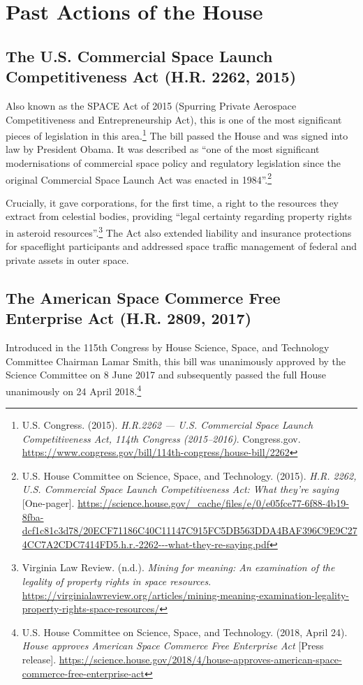 \section{Past Actions of the House}

\subsection{The U.S. Commercial Space Launch Competitiveness Act (H.R. 2262, 2015)}

Also known as the SPACE Act of 2015 (Spurring Private Aerospace Competitiveness and Entrepreneurship Act), this is one of the most significant pieces of legislation in this area.\footnote{U.S. Congress. (2015). \emph{H.R.2262 — U.S. Commercial Space Launch Competitiveness Act, 114th Congress (2015–2016)}. Congress.gov. \url{https://www.congress.gov/bill/114th-congress/house-bill/2262}} The bill passed the House and was signed into law by President Obama. It was described as “one of the most significant modernisations of commercial space policy and regulatory legislation since the original Commercial Space Launch Act was enacted in 1984”.\footnote{U.S. House Committee on Science, Space, and Technology. (2015). \emph{H.R. 2262, U.S. Commercial Space Launch Competitiveness Act: What they're saying} [One-pager]. \url{https://science.house.gov/_cache/files/e/0/e05fce77-6f88-4b19-8fba-dcf1c81c3d78/20ECF71186C40C11147C915FC5DB563DDA4BAF396C9E9C274CC7A2CDC7414FD5.h.r.-2262---what-they-re-saying.pdf}}

Crucially, it gave corporations, for the first time, a right to the resources they extract from celestial bodies, providing “legal certainty regarding property rights in asteroid resources”.\footnote{Virginia Law Review. (n.d.). \emph{Mining for meaning: An examination of the legality of property rights in space resources}. \url{https://virginialawreview.org/articles/mining-meaning-examination-legality-property-rights-space-resources/}} The Act also extended liability and insurance protections for spaceflight participants and addressed space traffic management of federal and private assets in outer space.

\subsection{The American Space Commerce Free Enterprise Act (H.R. 2809, 2017)}

Introduced in the 115th Congress by House Science, Space, and Technology Committee Chairman Lamar Smith, this bill was unanimously approved by the Science Committee on 8 June 2017 and subsequently passed the full House unanimously on 24 April 2018.\footnote{U.S. House Committee on Science, Space, and Technology. (2018, April 24). \emph{House approves American Space Commerce Free Enterprise Act} [Press release]. \url{https://science.house.gov/2018/4/house-approves-american-space-commerce-free-enterprise-act}}

